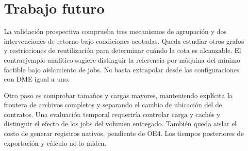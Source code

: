 \chapter{Trabajo futuro}
La validación prospectiva comprueba tres mecanismos de agrupación y dos intervenciones de retorno bajo condiciones acotadas. Queda estudiar otros grafos y restricciones de reutilización para determinar cuándo la cota es alcanzable. El contraejemplo analítico sugiere distinguir la referencia por máquina del mínimo factible bajo aislamiento de jobs. No basta extrapolar desde las configuraciones con DME igual a uno.

Otro paso es comprobar tamaños y cargas mayores, manteniendo explícita la frontera de archivos completos y separando el cambio de ubicación del de contratos. Una evaluación temporal requeriría controlar carga y cachés y distinguir el efecto de los jobs del volumen entregado. También queda aislar el costo de generar registros nativos, pendiente de OE4. Los tiempos posteriores de exportación y cálculo no lo miden.
